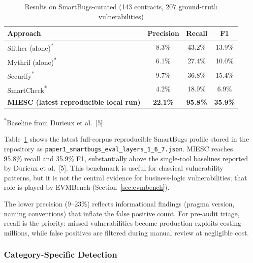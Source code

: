 \documentclass[conference]{IEEEtran}
\begin{document}
\begin{table}[htbp]
\caption{Results on SmartBugs-curated (143 contracts, 207 ground-truth vulnerabilities)}
\label{tab:smartbugs}
\centering
\begin{tabular}{@{}lccc@{}}
\toprule
\textbf{Approach} & \textbf{Precision} & \textbf{Recall} & \textbf{F1} \\
\midrule
Slither (alone)\textsuperscript{*} & 8.3\% & 43.2\% & 13.9\% \\
Mythril (alone)\textsuperscript{*} & 6.1\% & 27.4\% & 10.0\% \\
Securify\textsuperscript{*} & 9.7\% & 36.8\% & 15.4\% \\
SmartCheck\textsuperscript{*} & 4.2\% & 18.9\% & 6.9\% \\
\midrule
\textbf{MIESC (latest reproducible local run)} & \textbf{22.1\%} & \textbf{95.8\%} & \textbf{35.9\%} \\
\bottomrule
\end{tabular}

\vspace{2pt}
\footnotesize{\textsuperscript{*}Baseline from Durieux et al.~[5]}
\end{table}

Table~\ref{tab:smartbugs} shows the latest full-corpus reproducible SmartBugs profile stored in the repository as \texttt{paper1\_smartbugs\_eval\_layers\_1\_6\_7.json}. MIESC reaches 95.8\% recall and 35.9\% F1, substantially above the single-tool baselines reported by Durieux et al.~[5]. This benchmark is useful for classical vulnerability patterns, but it is not the central evidence for business-logic vulnerabilities; that role is played by EVMBench (Section~\ref{sec:evmbench}).

The lower precision (9--23\%) reflects informational findings (pragma version, naming conventions) that inflate the false positive count. For pre-audit triage, recall is the priority: missed vulnerabilities become production exploits costing millions, while false positives are filtered during manual review at negligible cost.

\subsubsection{Category-Specific Detection}
\end{document}
